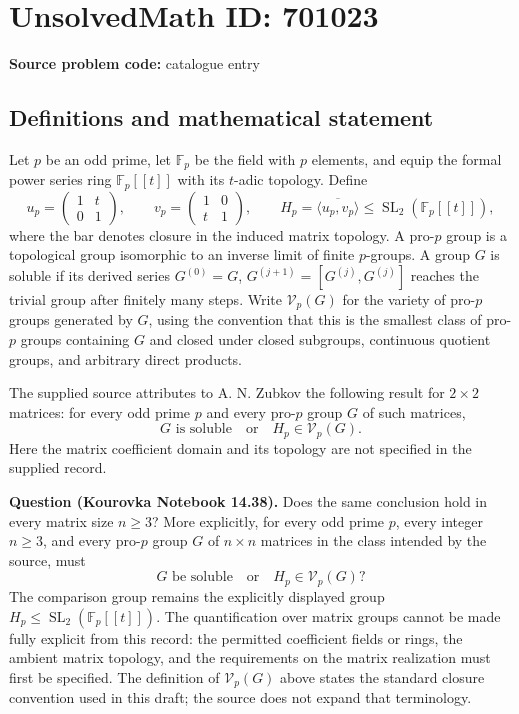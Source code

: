 \documentclass[11pt]{article}
\newcommand{\F}{\mathbb{F}}
\begin{document}
\section*{UnsolvedMath ID: 701023}
\textbf{Source problem code:} catalogue entry
\subsection{Definitions and mathematical statement}
Let $p$ be an odd prime, let $\F_p$ be the field with $p$ elements, and equip the formal power series ring $\F_p[[t]]$ with its $t$-adic topology. Define
\[
u_p=\begin{pmatrix}1&t\\0&1\end{pmatrix},\qquad
v_p=\begin{pmatrix}1&0\\t&1\end{pmatrix},\qquad
H_p=\overline{\langle u_p,v_p\rangle}\leq \operatorname{SL}_2(\F_p[[t]]),
\]
where the bar denotes closure in the induced matrix topology. A pro-$p$ group is a topological group isomorphic to an inverse limit of finite $p$-groups. A group $G$ is soluble if its derived series $G^{(0)}=G$, $G^{(j+1)}=[G^{(j)},G^{(j)}]$ reaches the trivial group after finitely many steps. Write $\mathcal V_p(G)$ for the variety of pro-$p$ groups generated by $G$, using the convention that this is the smallest class of pro-$p$ groups containing $G$ and closed under closed subgroups, continuous quotient groups, and arbitrary direct products.

The supplied source attributes to A. N. Zubkov the following result for $2\times2$ matrices: for every odd prime $p$ and every pro-$p$ group $G$ of such matrices,
\[
G\text{ is soluble}\quad\text{or}\quad H_p\in\mathcal V_p(G).
\]
Here the matrix coefficient domain and its topology are not specified in the supplied record.

\textbf{Question (Kourovka Notebook 14.38).} Does the same conclusion hold in every matrix size $n\geq3$? More explicitly, for every odd prime $p$, every integer $n\geq3$, and every pro-$p$ group $G$ of $n\times n$ matrices in the class intended by the source, must
\[
G\text{ be soluble}\quad\text{or}\quad H_p\in\mathcal V_p(G)?
\]
The comparison group remains the explicitly displayed group $H_p\leq\operatorname{SL}_2(\F_p[[t]])$. The quantification over matrix groups cannot be made fully explicit from this record: the permitted coefficient fields or rings, the ambient matrix topology, and the requirements on the matrix realization must first be specified. The definition of $\mathcal V_p(G)$ above states the standard closure convention used in this draft; the source does not expand that terminology.
\end{document}

